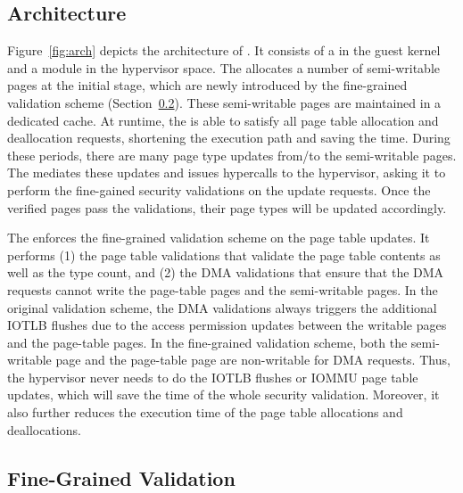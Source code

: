 \subsection{\name Architecture}
Figure~\ref{fig:arch} depicts the architecture of \name. It consists of a \cache in the guest kernel and a \name module in the hypervisor space. 
The \cache allocates a number of semi-writable pages at the initial stage,  which are newly introduced by the fine-grained validation scheme (Section~\ref{sec:fine-grained}).
These semi-writable pages are maintained in a dedicated cache.
At runtime, the \cache is able to satisfy all page table allocation and deallocation requests, shortening the execution path and saving the time.
During these periods, there are many page type updates from/to the semi-writable pages.
The \cache mediates these updates and issues hypercalls to the hypervisor, asking it to perform the fine-gained security validations on the update requests.
Once the verified pages pass the validations, their page types will be updated accordingly.

The \module enforces the fine-grained validation scheme on the page table updates. 
It performs (1) the page table validations that validate the page table contents as well as the type count, and (2) the DMA validations that ensure that the DMA requests cannot write the page-table pages and the semi-writable pages.
In the original validation scheme, the DMA validations always triggers the additional IOTLB flushes due to the access permission updates between the writable pages and the page-table pages.
In the fine-grained validation scheme, both the semi-writable page and the page-table page are non-writable for DMA requests. 
Thus, the hypervisor never needs to do the IOTLB flushes or IOMMU page table updates, which will save the time of the whole security validation.
Moreover, it also further reduces the execution time of the page table allocations and deallocations.

\subsection{Fine-Grained Validation}\label{sec:fine-grained}

